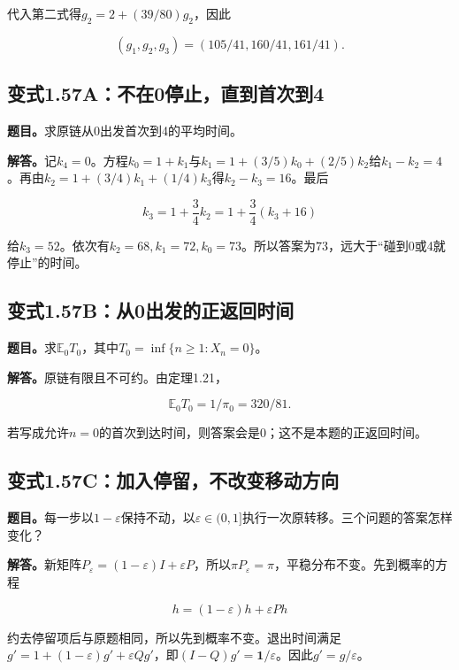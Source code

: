\documentclass[
  11pt,a4paper,UTF8,fontset=fandol]{ctexart}
\begin{document}
代入第二式得\(g_2=2+(39/80)g_2\)，因此

\[
\boxed{(g_1,g_2,g_3)=(105/41,160/41,161/41).}
\]

\subsection{变式1.57A：不在0停止，直到首次到4}\label{ux53d8ux5f0f1.57aux4e0dux57280ux505cux6b62ux76f4ux5230ux9996ux6b21ux52304}

\textbf{题目。}求原链从0出发首次到4的平均时间。

\textbf{解答。}记\(k_4=0\)。方程\(k_0=1+k_1\)与\(k_1=1+(3/5)k_0+(2/5)k_2\)给\(k_1-k_2=4\)。再由\(k_2=1+(3/4)k_1+(1/4)k_3\)得\(k_2-k_3=16\)。最后

\[
k_3=1+\frac34k_2=1+\frac34(k_3+16)
\]

给\(k_3=52\)。依次有\(k_2=68,k_1=72,k_0=73\)。所以答案为\(\boxed{73}\)，远大于``碰到0或4就停止''的时间。

\subsection{变式1.57B：从0出发的正返回时间}\label{ux53d8ux5f0f1.57bux4ece0ux51faux53d1ux7684ux6b63ux8fd4ux56deux65f6ux95f4}

\textbf{题目。}求\(\mathbb E_0T_0\)，其中\(T_0=\inf\{n\ge1:X_n=0\}\)。

\textbf{解答。}原链有限且不可约。由定理1.21，

\[
\boxed{\mathbb E_0T_0=1/\pi_0=320/81.}
\]

若写成允许\(n=0\)的首次到达时间，则答案会是0；这不是本题的正返回时间。

\subsection{变式1.57C：加入停留，不改变移动方向}\label{ux53d8ux5f0f1.57cux52a0ux5165ux505cux7559ux4e0dux6539ux53d8ux79fbux52a8ux65b9ux5411}

\textbf{题目。}每一步以\(1-\varepsilon\)保持不动，以\(\varepsilon\in(0,1]\)执行一次原转移。三个问题的答案怎样变化？

\textbf{解答。}新矩阵\(P_\varepsilon=(1-\varepsilon)I+\varepsilon P\)，所以\(\pi P_\varepsilon=\pi\)，平稳分布不变。先到概率的方程

\[
h=(1-\varepsilon)h+\varepsilon Ph
\]

约去停留项后与原题相同，所以先到概率不变。退出时间满足\(g'=1+(1-\varepsilon)g'+\varepsilon Qg'\)，即\((I-Q)g'=\mathbf1/\varepsilon\)。因此\(\boxed{g'=g/\varepsilon}\)。
\end{document}
